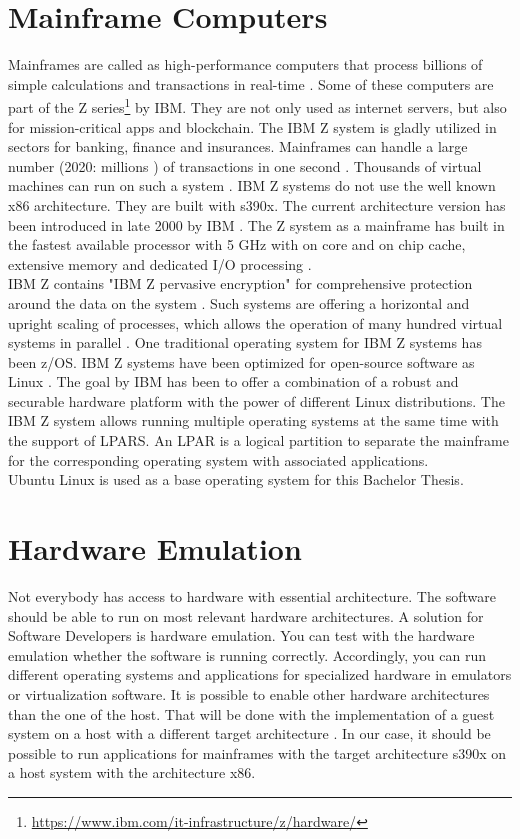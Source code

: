 \section{Mainframe Computers}

Mainframes are called as high-performance computers that process billions of simple calculations and transactions in real-time \cite{IBM}. Some of these computers are part of the Z series\footnote{\url{https://www.ibm.com/it-infrastructure/z/hardware/}} by IBM. They are not only used as internet servers, but also for mission-critical apps and blockchain. 
The IBM Z system is gladly utilized in sectors for banking, finance and insurances.
Mainframes can handle a large number (2020: millions \cite{IBM2}) of transactions in one second \cite[~p.56]{Tanenbaum2014}. 
Thousands of virtual machines can run on such a system \cite{OpenMainframeProject}. \gls{IBM Z systems} do not use the well known x86 architecture. 
They are built with s390x. The current architecture version has been introduced in late 2000 by IBM \cite[~p.15]{Block2019}. The Z system as a mainframe has built in the fastest available processor with 5 GHz with on core and on chip cache, extensive memory and dedicated I/O processing \cite{OpenMainframeProject}.
\\
IBM Z contains "IBM Z pervasive encryption" for comprehensive protection around the data on the system \cite[~p.4]{Lascu2020}. Such systems are offering a horizontal and upright \gls{scaling} of processes, which allows the operation of many hundred virtual systems in parallel \cite[~p.13]{Tschoeke2009}. One traditional operating system for IBM Z systems has been z/OS. 
IBM Z systems have been optimized for open-source software as Linux \cite[~p.8]{Lascu2020}. The goal by IBM has been to offer a combination of a robust and securable hardware platform with the power of different Linux distributions. 
The IBM Z system allows running multiple operating systems at the same time with the support of LPARS.
An \gls{LPAR} is a logical partition to separate the mainframe for the corresponding operating system with associated applications. \\
Ubuntu Linux is used as a base operating system for this Bachelor Thesis.


\section{Hardware Emulation}

Not everybody has access to hardware with essential architecture. The software should be able to run on most relevant hardware architectures. A solution for Software Developers is hardware emulation. 
You can test with the hardware emulation whether the software is running correctly. 
Accordingly, you can run different operating systems and applications for specialized hardware in emulators or virtualization software. 
It is possible to enable other hardware architectures than the one of the host. 
That will be done with the implementation of a guest system on a host with a different target architecture \cite[~p.3]{Rosenthal2015}. In our case, it should be possible to run applications for mainframes with the target
architecture s390x on a host system with the architecture x86.


